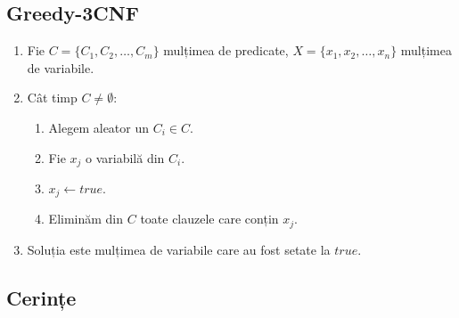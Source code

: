 \documentclass[a4paper,12pt]{article}
\begin{document}
\subsection{Greedy-3CNF}

\begin{enumerate}
\item
Fie $C = \{C_1, C_2, \dots, C_m\}$ mulțimea de predicate,
$X = \{x_1, x_2, \dots, x_n\}$ mulțimea de variabile.
\item
Cât timp $C \neq \emptyset$:
\begin{enumerate}
\item Alegem aleator un $C_i \in C$.
\item Fie $x_j$ o variabilă din $C_i$.
\item $x_j \leftarrow true$.
\item Eliminăm din $C$ toate clauzele care conțin $x_j$.
\end{enumerate}
\item Soluția este mulțimea de variabile care au fost setate la $true$.
\end{enumerate}

\subsection{Cerințe}
\end{document}

